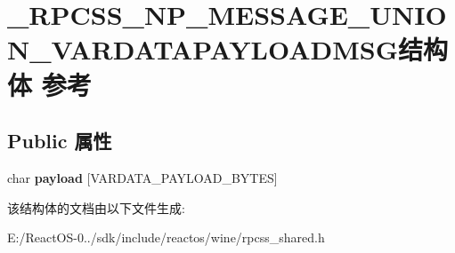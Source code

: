 \hypertarget{struct___r_p_c_s_s___n_p___m_e_s_s_a_g_e___u_n_i_o_n___v_a_r_d_a_t_a_p_a_y_l_o_a_d_m_s_g}{}\section{\+\_\+\+R\+P\+C\+S\+S\+\_\+\+N\+P\+\_\+\+M\+E\+S\+S\+A\+G\+E\+\_\+\+U\+N\+I\+O\+N\+\_\+\+V\+A\+R\+D\+A\+T\+A\+P\+A\+Y\+L\+O\+A\+D\+M\+S\+G结构体 参考}
\label{struct___r_p_c_s_s___n_p___m_e_s_s_a_g_e___u_n_i_o_n___v_a_r_d_a_t_a_p_a_y_l_o_a_d_m_s_g}
\subsection*{Public 属性}
\begin{DoxyCompactItemize}
\item 
\mbox{\label{struct___r_p_c_s_s___n_p___m_e_s_s_a_g_e___u_n_i_o_n___v_a_r_d_a_t_a_p_a_y_l_o_a_d_m_s_g_a9d6cd33baf0f4a1c5e2abc7b530e08a9}} 
char {\bfseries payload} \mbox{[}V\+A\+R\+D\+A\+T\+A\+\_\+\+P\+A\+Y\+L\+O\+A\+D\+\_\+\+B\+Y\+T\+ES\mbox{]}
\end{DoxyCompactItemize}


该结构体的文档由以下文件生成\+:\begin{DoxyCompactItemize}
\item 
E\+:/\+React\+O\+S-\/0../sdk/include/reactos/wine/rpcss\+\_\+shared.\+h\end{DoxyCompactItemize}
